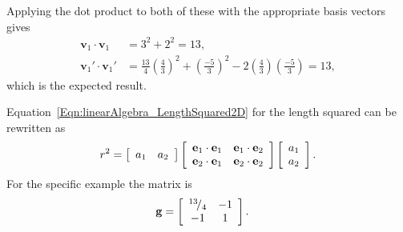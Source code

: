 Applying the dot product to both of these with the appropriate basis vectors gives
\begin{align}
  \mathbf{v}_1 \cdot \mathbf{v}_1   &= 3^2 + 2^2 = 13, \nonumber \\
  \mathbf{v}_1' \cdot \mathbf{v}_1' &= \frac{13}{4} \left( \frac{4}{3} \right)^2  + \left( \frac{-5}{3} \right)^2 - 2 \left( \frac{4}{3} \right) \left( \frac{-5}{3} \right) = 13, \nonumber
\end{align}
which is the expected result.

Equation~\eqref{Eqn:linearAlgebra_LengthSquared2D} for the length squared can be rewritten as
\begin{align}
  r^2 = \left[ \begin{array}{c c} a_1 & a_2 \\ \end{array} \right]
        \left[ \begin{array}{c c} \mathbf{e}_1 \cdot \mathbf{e}_1 & \mathbf{e}_1 \cdot \mathbf{e}_2 \\
      							  \mathbf{e}_2 \cdot \mathbf{e}_1 & \mathbf{e}_2 \cdot \mathbf{e}_2 \\ \end{array} \right]
	    \left[ \begin{array}{c} a_1 \\ a_2 \\ \end{array} \right] .
\end{align}
For the specific example the matrix is
\begin{align}
  \mathbf{g} &= \left[ \begin{array}{c c} {}^{13}\!/_{4} & -1 \\
      							  		 -1			   & 1  \\ \end{array} \right] . \nonumber
\end{align}

